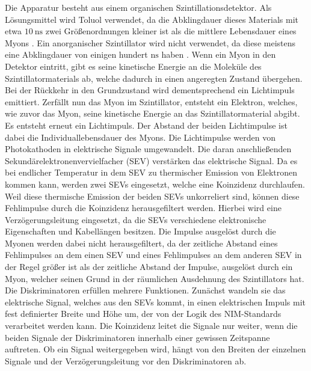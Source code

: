 Die Apparatur besteht aus einem organischen Szintillationsdetektor.
Als Lösungsmittel wird Toluol verwendet, da die Abklingdauer dieses Materials mit etwa $\SI{10}{\nano\second}$ zwei Größenordnungen kleiner ist als die mittlere Lebensdauer eines Myons \cite{Agashe:2014kda}.
Ein anorganischer Szintillator wird nicht verwendet, da diese meistens eine Abklingdauer von einigen hundert $\si{\nano\second}$ haben \cite{anorganisch}.
Wenn ein Myon in den Detektor eintritt, gibt es seine kinetische Energie an die Moleküle des Szintillatormaterials ab, welche dadurch in einen angeregten Zustand übergehen.
Bei der Rückkehr in den Grundzustand wird dementsprechend ein Lichtimpuls emittiert.
Zerfällt nun das Myon im Szintillator, entsteht ein Elektron, welches, wie zuvor das Myon, seine kinetische Energie an das Szintillatormaterial abgibt.
Es entsteht erneut ein Lichtimpuls.
Der Abstand der beiden Lichtimpulse ist dabei die Individuallebensdauer des Myons.
Die Lichtimpulse werden von Photokathoden in elektrische Signale umgewandelt.
Die daran anschließenden Sekundärelektronenvervielfacher (SEV) verstärken das elektrische Signal.
Da es bei endlicher Temperatur in dem SEV zu thermischer Emission von Elektronen kommen kann, werden zwei SEVs eingesetzt, welche eine Koinzidenz durchlaufen.
Weil diese thermische Emission der beiden SEVs unkorreliert sind, können diese Fehlimpulse durch die Koinzidenz herausgefiltert werden.
Hierbei wird eine Verzögerungsleitung eingesetzt, da die SEVs verschiedene elektronische Eigenschaften und Kabellängen besitzen.
Die Impulse ausgelöst durch die Myonen werden dabei nicht herausgefiltert, da der zeitliche Abstand eines Fehlimpulses an dem einen SEV und eines Fehlimpulses an dem anderen SEV in der Regel größer ist als der zeitliche Abstand der Impulse, ausgelöst durch ein Myon, welcher seinen Grund in der räumlichen Ausdehnung des Szintillators hat.\\
Die Diskriminatoren erfüllen mehrere Funktionen.
Zunächst wandeln sie das elektrische Signal, welches aus den SEVs kommt, in einen elektrischen Impuls mit fest definierter Breite und Höhe um, der von der Logik des NIM-Standards verarbeitet werden kann.
Die Koinzidenz leitet die Signale nur weiter, wenn die beiden Signale der Diskriminatoren innerhalb einer gewissen Zeitspanne auftreten.
Ob ein Signal weitergegeben wird, hängt von den Breiten der einzelnen Signale und der Verzögerungsleitung vor den Diskriminatoren ab.
